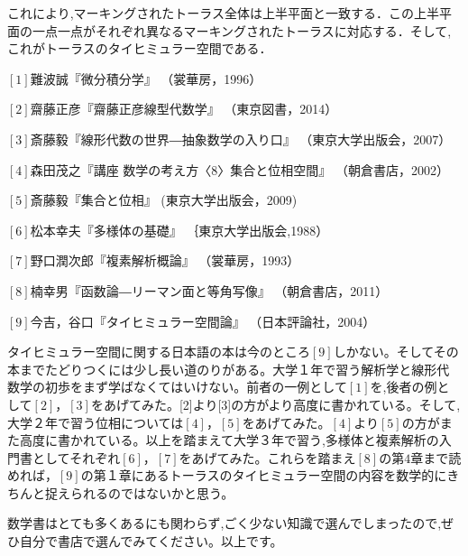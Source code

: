 \begin{figure}[h]
\begin{minipage}{0.5\hsize}
\end{minipage}
\begin{minipage}{0.5\hsize}
\end{minipage}
\end{figure}
これにより,マーキングされたトーラス全体は上半平面と一致する．この上半平面の一点一点がそれぞれ異なるマーキングされたトーラスに対応する．そして,これがトーラスのタイヒミュラー空間である．
\begin{description}
\item
$[1]$難波誠『微分積分学』
（裳華房，1996）
\item
$[2]$齋藤正彦『齋藤正彦線型代数学』
（東京図書，2014）
\item
$[3]$斎藤毅『線形代数の世界―抽象数学の入り口』
（東京大学出版会，2007）
\item
$[4]$森田茂之『講座 数学の考え方〈8〉集合と位相空間』
（朝倉書店，2002）
\item
$[5]$斎藤毅『集合と位相』
(東京大学出版会，2009)
\item
$[6]$松本幸夫『多様体の基礎』
｛東京大学出版会,1988）
\item
$[7]$野口潤次郎『複素解析概論』
（裳華房，1993）
\item
$[8]$楠幸男『函数論―リーマン面と等角写像』
（朝倉書店，2011）
\item
$[9]$今吉，谷口『タイヒミュラー空間論』
（日本評論社，2004）
\end{description}
タイヒミュラー空間に関する日本語の本は今のところ$[9]$しかない。そしてその本までたどりつくには少し長い道のりがある。大学１年で習う解析学と線形代数学の初歩をまず学ばなくてはいけない。前者の一例として$[1]$を,後者の例として$[2]，[3]$をあげてみた。[2]より[3]の方がより高度に書かれている。そして,大学２年で習う位相については$[4]，[5]$をあげてみた。$[4]$より$[5]$の方がまた高度に書かれている。以上を踏まえて大学３年で習う,多様体と複素解析の入門書としてそれぞれ$[6]，[7]$をあげてみた。これらを踏まえ$[8]$の第$4$章まで読めれば，$[9]$の第１章にあるトーラスのタイヒミュラー空間の内容を数学的にきちんと捉えられるのではないかと思う。

数学書はとても多くあるにも関わらず,ごく少ない知識で選んでしまったので,ぜひ自分で書店で選んでみてください。以上です。







